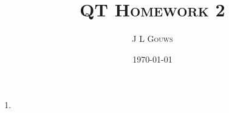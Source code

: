 \documentclass[12pt,a4]{article}
\title{
\textsc{QT Homework 2}
}
\author{\textsc{J L Gouws}
}
\date{\today
\\[1cm]}
\begin{document}
\thispagestyle{empty}

\maketitle


\begin{enumerate}
  \item
    \begin{enumerate}
    \end{enumerate}
\end{enumerate}
\end{document}

